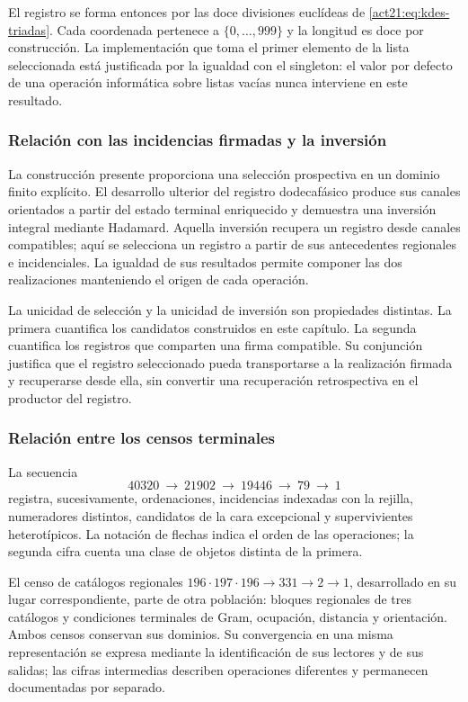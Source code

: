 El registro se forma entonces por las doce divisiones euclídeas de
\eqref{act21:eq:kdes-triadas}. Cada coordenada pertenece a
$\{0,\ldots,999\}$ y la longitud es doce por construcción. La
implementación que toma el primer elemento de la lista seleccionada
está justificada por la igualdad con el singleton: el valor por defecto
de una operación informática sobre listas vacías nunca interviene en
este resultado.

\subsubsection{Relación con las incidencias firmadas y la inversión}

La construcción presente proporciona una selección prospectiva en un
dominio finito explícito. El desarrollo ulterior del registro
dodecafásico produce sus canales orientados a partir del estado
terminal enriquecido y demuestra una inversión integral mediante
Hadamard. Aquella inversión recupera un registro desde canales
compatibles; aquí se selecciona un registro a partir de sus
antecedentes regionales e incidenciales. La igualdad de sus resultados
permite componer las dos realizaciones manteniendo el origen de cada
operación.

La unicidad de selección y la unicidad de inversión son propiedades
distintas. La primera cuantifica los candidatos construidos en este
capítulo. La segunda cuantifica los registros que comparten una firma
compatible. Su conjunción justifica que el registro seleccionado pueda
transportarse a la realización firmada y recuperarse desde ella, sin
convertir una recuperación retrospectiva en el productor del registro.

\subsubsection{Relación entre los censos terminales}

La secuencia
\[
 40320\ \longrightarrow\ 21902\ \longrightarrow\ 19446
 \ \longrightarrow\ 79\ \longrightarrow\ 1
\]
registra, sucesivamente, ordenaciones, incidencias indexadas con la
rejilla, numeradores distintos, candidatos de la cara excepcional y
supervivientes heterotípicos. La notación de flechas indica el orden de
las operaciones; la segunda cifra cuenta una clase de objetos
distinta de la primera.

El censo de catálogos regionales
$196\cdot197\cdot196\longrightarrow331\longrightarrow2
\longrightarrow1$, desarrollado en su lugar correspondiente, parte de
otra población: bloques regionales de tres catálogos y condiciones
terminales de Gram, ocupación, distancia y orientación. Ambos censos
conservan sus dominios. Su convergencia en una misma representación se
expresa mediante la identificación de sus lectores y de sus salidas;
las cifras intermedias describen operaciones diferentes y permanecen
documentadas por separado.

